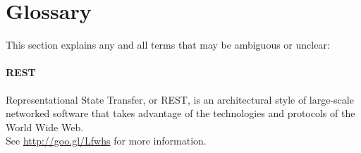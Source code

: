 \documentclass{report}
\begin{document}
	\section{Glossary}
		This section explains any and all terms that may be ambiguous or unclear:
		\paragraph{REST} 
			Representational State Transfer, or REST, is an architectural style of large-scale networked software that takes advantage of the technologies and protocols of the World Wide Web. \\
See \href{http://goo.gl/Lfwhs}{http://goo.gl/Lfwhs} for more information.
\end{document}
